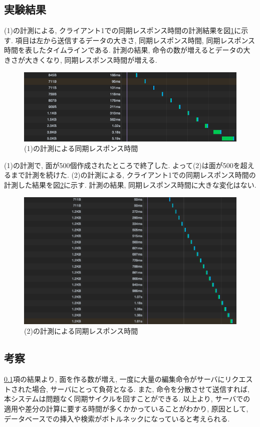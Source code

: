 \subsection{実験結果} \label{実験2の結果}
(1)の計測による, クライアント1での同期レスポンス時間の計測結果を図\ref{jikken3}に示す.
項目は左から送信するデータの大きさ, 同期レスポンス時間, 同期レスポンス時間を表したタイムラインである. 計測の結果, 命令の数が増えるとデータの大きさが大きくなり, 同期レスポンス時間が増える.
\begin{figure}[htbp]
 \begin{center}
	 \includegraphics[scale=0.5]{images/jikken3}
	 \caption{(1)の計測による同期レスポンス時間}
	 \label{jikken3}
 \end{center}
\end{figure}
(1)の計測で, 面が500個作成されたところで終了した. よって(2)は面が500を超えるまで計測を続けた.
(2)の計測による, クライアント1での同期レスポンス時間の計測した結果を図\ref{jikken2}に示す.
計測の結果, 同期レスポンス時間に大きな変化はない.
\begin{figure}[htbp]
 \begin{center}
	 \includegraphics[scale=0.5]{images/jikken2}
	 \caption{(2)の計測による同期レスポンス時間}
	 \label{jikken2}
 \end{center}
\end{figure}
\subsection{考察}
\ref{実験2の結果}項の結果より, 面を作る数が増え, 一度に大量の編集命令がサーバにリクエストされた場合, サーバにとって負荷となる.
また, 命令を分散させて送信すれば, 本システムは問題なく同期サイクルを回すことができる.
以上より, サーバでの適用や差分の計算に要する時間が多くかかっていることがわかり, 原因として, データベースでの挿入や検索がボトルネックになっていると考えられる.
